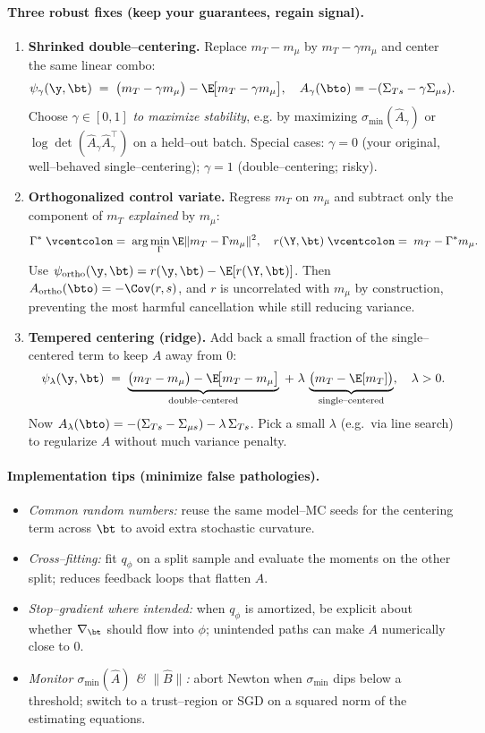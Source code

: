 \paragraph{Three robust fixes (keep your guarantees, regain signal).}
\begin{enumerate}
\item \textbf{Shrinked double–centering.} Replace $m_T-m_\mu$ by $m_T-\gamma m_\mu$ and center the same linear combo:
\[
\psi_\gamma(\y,\bt)\;=\;\big(m_T-\gamma m_\mu\big)
-\E\!\big[m_T-\gamma m_\mu\big],
\quad
A_\gamma(\bto)=-(\Sigma_{Ts}-\gamma\Sigma_{\mu s}).
\]
Choose $\gamma\in[0,1]$ \emph{to maximize stability}, e.g. by maximizing $\sigma_{\min}(\widehat A_\gamma)$ or $\log\det(\widehat A_\gamma\widehat A_\gamma^\top)$ on a held–out batch. 
Special cases: $\gamma=0$ (your original, well–behaved single–centering); $\gamma=1$ (double–centering; risky).

\item \textbf{Orthogonalized control variate.} Regress $m_T$ on $m_\mu$ and subtract only the component of $m_T$ \emph{explained} by $m_\mu$:
\[
\Gamma^\ast \;\vcentcolon=\;\arg\min_\Gamma \E\|m_T-\Gamma m_\mu\|^2,
\quad r(\Y,\bt)\;\vcentcolon=\;m_T-\Gamma^\ast m_\mu.
\]
Use $\psi_{\mathrm{ortho}}(\y,\bt)=r(\y,\bt)-\E[r(\Y,\bt)]$. Then
$A_{\mathrm{ortho}}(\bto)=-\Cov(r,s)$,
and $r$ is uncorrelated with $m_\mu$ by construction, preventing the most harmful cancellation while still reducing variance.

\item \textbf{Tempered centering (ridge).} Add back a small fraction of the single–centered term to keep $A$ away from $0$:
\[
\psi_{\lambda}(\y,\bt)\;=\;\underbrace{\big(m_T-m_\mu\big)-\E\!\big[m_T-m_\mu\big]}_{\text{double–centered}}
\;+\;\lambda\,\underbrace{\big(m_T-\E[m_T]\big)}_{\text{single–centered}},\quad \lambda>0.
\]
Now $A_\lambda(\bto)=-(\Sigma_{Ts}-\Sigma_{\mu s})-\lambda\,\Sigma_{Ts}$.
Pick a small $\lambda$ (e.g.\ via line search) to regularize $A$ without much variance penalty.
\end{enumerate}

\paragraph{Implementation tips (minimize false pathologies).}
\begin{itemize}
\item \emph{Common random numbers:} reuse the same model–MC seeds for the centering term across $\bt$ to avoid extra stochastic curvature.
\item \emph{Cross–fitting:} fit $q_\phi$ on a split sample and evaluate the moments on the other split; reduces feedback loops that flatten $A$.
\item \emph{Stop–gradient where intended:} when $q_\phi$ is amortized, be explicit about whether $\nabla_\bt$ should flow into $\phi$; unintended paths can make $A$ numerically close to $0$.
\item \emph{Monitor $\sigma_{\min}(\widehat A)$ \& $\|\widehat B\|$:} abort Newton when $\sigma_{\min}$ dips below a threshold; switch to a trust–region or SGD on a squared norm of the estimating equations.
\end{itemize}

